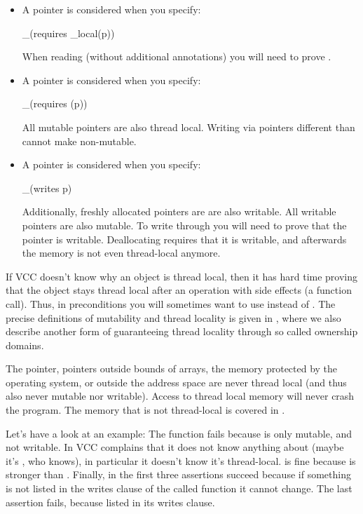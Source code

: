 \begin{itemize}
\item A pointer  is considered 
when you specify:
\begin{VCC}
_(requires \thread_local(p))
\end{VCC}
When reading  (without additional annotations) you will need to prove .

\item A pointer  is considered  when you specify:
\begin{VCC}
_(requires \mutable(p))
\end{VCC}
All mutable pointers are also thread local.
Writing via pointers different than  cannot make  non-mutable.

\item A pointer  is considered  when you specify:
\begin{VCC}
_(writes p)
\end{VCC}
Additionally, freshly allocated pointers are are also writable.
All writable pointers are also mutable.
To write through  you will need to prove that the pointer is writable.
Deallocating  requires that it is writable, and afterwards
the memory is not even thread-local anymore.
\end{itemize}

\begin{note}
If VCC doesn't know why an object is thread local, then it has
hard time proving that the object stays thread local after an operation
with side effects (\eg a function call).
Thus, in preconditions you will sometimes want to use
 instead of .
The precise definitions of mutability and thread locality
is given in ,
where we also describe another form of guaranteeing thread locality
through so called ownership domains.
\end{note}

The  pointer, pointers outside bounds of arrays,
the memory protected by the operating system, or outside
the address space are never thread local (and thus also never mutable
nor writable).
Access to thread local memory will never crash the program.
The memory that is not thread-local is covered in 
.

Let's have a look at an example:
\noindent
The function  fails because  is only
mutable, and not writable.
In  VCC complains that it does not know
anything about  (maybe it's , who knows),
in particular it doesn't know it's thread-local.
 is fine because \vcc{\mutable} is stronger
than .
Finally, in  the first three assertions succeed
because if something is not listed in the writes clause
of the called function it cannot change.
The last assertion fails, because  listed 
in its writes clause.

